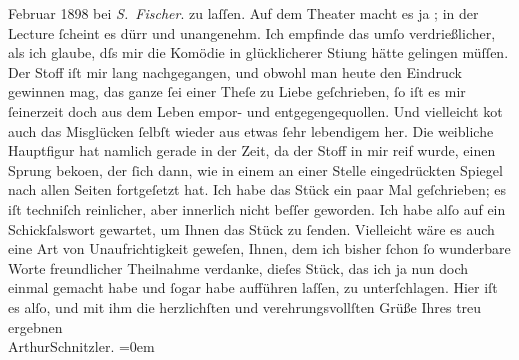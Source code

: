 \begin{ledgroupsized}[t]{13cm}
{{{                            Februar 1898 bei \emph{S. Fischer}.}}}\label{K_L00636_1h} zu laſſen. Auf dem Theater macht es ja
                        \label{K_L00636_2v}\label{K_L00636_2h}; in der Lecture ſcheint es dürr
                    und unangenehm. Ich empfinde das umſo verdrießlicher, als ich glaube, dſs mir
                    die Komödie in glücklicherer Sti{\geminationm}ung hätte gelingen
                    müſſen. {\pb}Der Stoff iſt mir lang
                    nachgegangen, und obwohl man heute den Eindruck gewinnen mag, das ganze ſei
                    einer Theſe zu Liebe geſchrieben, ſo iſt es mir ſeinerzeit doch aus dem Leben
                    empor- und entgegengequollen. Und vielleicht ko{\geminationm}t
                    auch das Misglücken ſelbſt wieder aus etwas ſehr lebendigem {\pb}her. Die weibliche Hauptfigur hat
                    namlich gerade in der Zeit, da der Stoff in mir reif wurde, einen Sprung beko{\geminationm}en, der ſich dann, wie in einem an einer Stelle
                    eingedrückten Spiegel nach allen Seiten fortgeſetzt hat. Ich habe das Stück ein paar Mal geſchrieben; es iſt
                    techniſch reinlicher, aber innerlich {\pb}nicht beſſer geworden. Ich habe alſo auf ein Schickſalswort gewartet, um Ihnen
                    das Stück zu ſenden. Vielleicht wäre es auch eine Art von Unaufrichtigkeit
                    geweſen, Ihnen, dem ich bisher ſchon ſo wunderbare Worte freundlicher Theilnahme
                    verdanke, dieſes Stück, das ich ja nun doch einmal {\pb}gemacht habe und ſogar habe aufführen
                    laſſen, zu unterſchlagen.\pend
           \pstart
           Hier iſt es alſo, und mit ihm die
                    herzlichſten und verehrungsvollſten Grüße Ihres treu ergebnen{\\[\baselineskip]}\spacefill\mbox{ArthurSchnitzler.}\pend
           \leftskip=0em{}\endnumbering{}\end{ledgroupsized}  \newcommand{\dateiname}{L00636}\newcommand{\titel}{Arthur Schnitzler an Georg Brandes, 11. 1. 1897}\newcommand{\editorInnen}{Martin Anton Müller und Gerd-Hermann Susen}
      